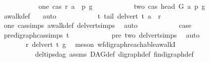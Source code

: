 \begin{isabellebody}
\ \ \ \ \ \ \ \ \ \ \ one{\isacharcolon}{\kern0pt}\ {\isachardoublequoteopen}cas\ r\ {\isacharparenleft}{\kern0pt}a\ {\isacharhash}{\kern0pt}\ p{\isacharparenright}{\kern0pt}\ g{\isachardoublequoteclose}\isanewline
\ \ \ \ \ \ \ \ \isamarkupfalse%
\ \isamarkupfalse%
\ two{\isacharcolon}{\kern0pt}\ {\isachardoublequoteopen}cas\ {\isacharparenleft}{\kern0pt}head\ G\ a{\isacharparenright}{\kern0pt}\ p\ g{\isachardoublequoteclose}\isanewline
\ \ \ \ \ \ \ \ \ \ \isamarkupfalse%
\ awalk{\isacharunderscore}{\kern0pt}def\ \ \isamarkupfalse%
\ auto\isanewline
\ \ \ \ \ \ \ \ \isamarkupfalse%
\ \isamarkupfalse%
\ t{\isacharcolon}{\kern0pt}\ {\isachardoublequoteopen}tail\ {\isacharparenleft}{\kern0pt}del{\isacharunderscore}{\kern0pt}vert\ t{\isacharparenright}{\kern0pt}\ a\ {\isacharequal}{\kern0pt}\ r{\isachardoublequoteclose}\isanewline
\ \ \ \ \ \ \ \ \ \ \isamarkupfalse%
\ one\ cas{\isachardot}{\kern0pt}simps\ awalk{\isacharunderscore}{\kern0pt}def\ del{\isacharunderscore}{\kern0pt}vert{\isacharunderscore}{\kern0pt}simps{\isacharparenleft}{\kern0pt}{}{\isacharparenright}{\kern0pt}\ \isamarkupfalse%
\ auto\isanewline
\ \ \ \ \ \ \ \ \isamarkupfalse%
\ \isamarkupfalse%
\ {\isacharquery}{\kern0pt}case\ \isanewline
\ \ \ \ \ \ \ \ \ \ \isamarkupfalse%
\ pre{\isacharunderscore}{\kern0pt}digraph{\isachardot}{\kern0pt}cas{\isachardot}{\kern0pt}simps{\isacharparenleft}{\kern0pt}{}{\isacharparenright}{\kern0pt}\ t\isanewline
\ \ \ \ \ \ \ \ \ \ \isamarkupfalse%
\ pre\ two\ del{\isacharunderscore}{\kern0pt}vert{\isacharunderscore}{\kern0pt}simps{\isacharparenleft}{\kern0pt}{}{\isacharparenright}{\kern0pt}\ \isamarkupfalse%
\ auto\isanewline
\ \ \ \ \ \ \isamarkupfalse%
\isanewline
\ \ \ \ \isamarkupfalse%
\isanewline
\ \ \ \ \isamarkupfalse%
\ \isamarkupfalse%
\ {\isachardoublequoteopen}r\ {\isasymrightarrow}\isactrlsup {\isacharasterisk}{\kern0pt}\isactrlbsub del{\isacharunderscore}{\kern0pt}vert\ t\isactrlesub \ g{\isachardoublequoteclose}\ \isamarkupfalse%
\ {\isacharparenleft}{\kern0pt}meson\ wf{\isacharunderscore}{\kern0pt}digraph{\isachardot}{\kern0pt}reachable{\isacharunderscore}{\kern0pt}awalkI\ \ \isanewline
\ \ \ \ \ \ \ \ \ \ del{\isacharunderscore}{\kern0pt}tips{\isacharunderscore}{\kern0pt}dag\ assms{\isacharparenleft}{\kern0pt}{}{\isacharparenright}{\kern0pt}\ DAG{\isacharunderscore}{\kern0pt}def\ digraph{\isacharunderscore}{\kern0pt}def\ fin{\isacharunderscore}{\kern0pt}digraph{\isacharunderscore}{\kern0pt}def{\isacharparenright}{\kern0pt}\isanewline

\end{isabellebody}
